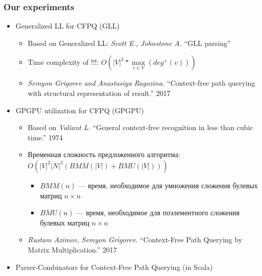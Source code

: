 \documentclass[xcolor=table,aspectratio=169]{beamer}
\begin{document}
\begin{frame}[fragile]
  \transwipe[direction=90]
  \frametitle{Our experiments}

\begin{itemize} 
\item Generalized LL for CFPQ (GLL)
\begin{itemize} 
  \item Based on Generalized LL: \emph{Scott E., Johnstone A.} ``GLL parsing''
  \item Time complexity of !!!: $O\left(|V|^3*\max\limits_{v \in V}\left(deg^+\left(v\right)\right)\right)$
  \item \emph{Semyon Grigorev and Anastasiya Ragozina.} ``Context-free path querying with structural 
  representation of result.'' 2017
\end{itemize}
\item GPGPU utilization for CFPQ (GPGPU)
\begin{itemize} 
   \item Based on \emph{Valiant L.} ``General context-free recognition in less than cubic time.'' 1974
   \item Временная сложность предложенного алгоритма: $O(|V|^2 |N|^3(BMM(|V|) + BMU (|V|)))$
     \begin{itemize} 
      \item $BMM(n)$ --- время, необходимое для умножения сложения булевых матриц $n\times n$
      \item $BMU(n)$ --- время, необходимое для поэлементного сложения булевых матриц $n\times n$
     \end{itemize}
   \item \emph{Rustam Azimov, Semyon Grigorev.} ``Context-Free Path Querying by Matrix 
     Multiplication.'' 2017
\end{itemize}
\item Parser-Combinators for Context-Free Path Querying (in Scala)
\end{itemize}
\end{frame}
\end{document}

